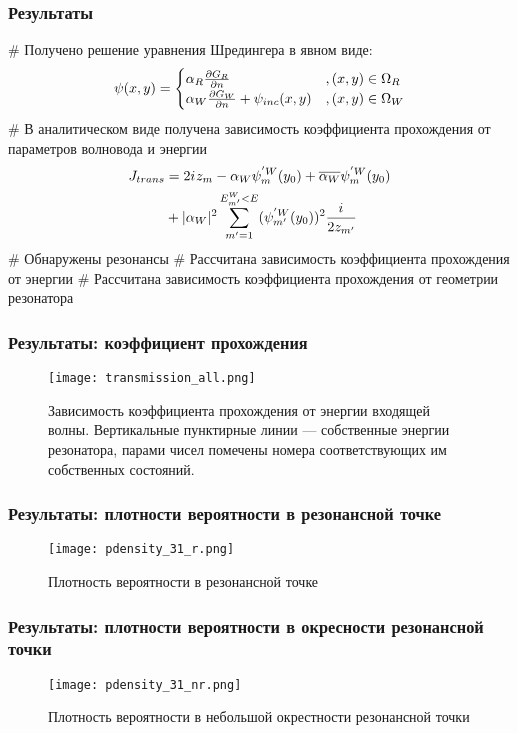 \documentclass{beamer}
\begin{document}
\begin{frame}[fragile]
\frametitle{Результаты}
\begin{easylist}[itemize]
# Получено решение уравнения Шредингера в явном виде:
\[
\psi(x, y) =
\begin{cases}
\alpha_R \pdv{G_R}{n} (x, y, x_0, y_0; k) &, (x, y) \in \Omega_R \\
\alpha_W \pdv{G_W}{n} (x, y, x_0, y_0; k) + \psi_{inc}(x, y) &, (x, y) \in \Omega_W  
\end{cases}
\]
# В аналитическом виде получена зависимость коэффициента прохождения от параметров волновода и энергии
\begin{align*}
J_{trans}
&= 2 {i\mkern1mu} z_m - \alpha_W \psi_m^{'W}(y_0) + \overline{\alpha_W} \psi_m^{'W}(y_0)\\
&+ |\alpha_W|^2 \sum_{m'= 1}^{E^W_{m'} < E} (\psi_{m'}^{'W}(y_0))^2 \frac{{i\mkern1mu}}{2 z_{m'}}
\end{align*}
# Обнаружены резонансы
# Рассчитана зависимость коэффициента прохождения от энергии
# Рассчитана зависимость коэффициента прохождения от геометрии резонатора
\end{easylist}
\end{frame}

\begin{frame}[fragile]
\frametitle{Результаты: коэффициент прохождения}
\begin{figure}
\texttt{[image: transmission\_all.png]}
\caption{Зависимость коэффициента прохождения от энергии входящей волны. Вертикальные пунктирные линии — собственные энергии резонатора, парами чисел помечены номера соответствующих им собственных состояний.}
\end{figure}
\end{frame}

\begin{frame}[fragile]
\frametitle{Результаты: плотности вероятности в резонансной точке}
\begin{figure}
\texttt{[image: pdensity\_31\_r.png]}
\caption{Плотность вероятности в резонансной точке}
\end{figure}
\end{frame}

\begin{frame}[fragile]
\frametitle{Результаты: плотности вероятности в окресности резонансной точки}
\begin{figure}
\texttt{[image: pdensity\_31\_nr.png]}
\caption{Плотность вероятности в небольшой окрестности резонансной точки}
\end{figure}
\end{frame}
\end{document}
